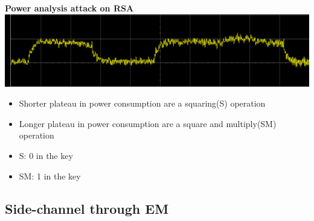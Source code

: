 \documentclass{beamer}
\begin{document}
		\begin{frame}
			\textbf{Power analysis attack on RSA}
		  \includegraphics[width= \textwidth]{Images/Power_attack.png} 
		  \begin{itemize}
		  \item Shorter plateau in power consumption are a squaring(S) operation
		  \item Longer plateau in power consumption are a square and multiply(SM) operation
		  \item S: 0 in the key
		  \item SM: 1 in the key
		  \end{itemize}
		\end{frame}
	\subsection{Side-channel through EM}
		
\end{document}
